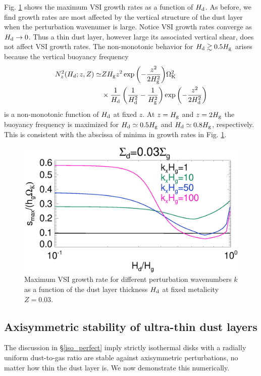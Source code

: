 Fig. \ref{compare_eigenvals_fixZ} shows the maximum VSI growth rates
as a function of $H_\mathrm{d}$. As before, we find growth
rates are most affected by the vertical structure of the dust layer
when the perturbation wavenumer is large. Notice VSI growth rates converge as
$H_\mathrm{d}\to 0$. %
Thus a thin dust layer, however large its associated vertical shear,
does not affect VSI growth rates. The non-monotonic behavior for $H_\mathrm{d}\gtrsim
0.5H_\mathrm{g}$ arises because the vertical buoyancy frequency 
\begin{align*}
N_z^2(H_d;z,Z) \simeq &ZH_\mathrm{g} z^2
\exp{\left(-\frac{z^2}{2H_\mathrm{g}^2}\right)}\Omega_{\rm K}^2\notag\\
&\times 
\frac{1}{H_\mathrm{d}}\left(\frac{1}{H_\mathrm{d}^2} -
\frac{1}{H_\mathrm{g}^2}\right)\exp{\left(-\frac{z^2}{2H_\mathrm{d}^2}\right)}  
\end{align*}
is a non-monotonic function of $H_\mathrm{d}$ at fixed $z$. At $z=H_\mathrm{g}$ and $z=2H_\mathrm{g}$
the buoyancy frequency is maximized for $H_\mathrm{d}\simeq0.5H_\mathrm{g}$ and
$H_\mathrm{d}\simeq 0.8H_\mathrm{g}$, respectively. This is consistent with the abscissa
of minima in growth rates in Fig. \ref{compare_eigenvals_fixZ}. 

\begin{figure}
  \includegraphics[width=\linewidth]{figures/compare_eigenvals_fixZ} 
  \caption{Maximum VSI growth rate for different perturbation
    wavenumbers $k$ as a function of the dust layer
    thickness $H_\mathrm{d}$ at fixed metalicity $Z=0.03$. 
    \label{compare_eigenvals_fixZ}
    }
\end{figure}

\subsection{Axisymmetric stability of ultra-thin dust layers}
The discussion in \S\ref{iso_perfect} imply strictly  
isothermal disks with a radially uniform dust-to-gas ratio are
stable against axisymmetric perturbations, no matter how thin the dust
layer is. We now demonstrate this numerically. 

